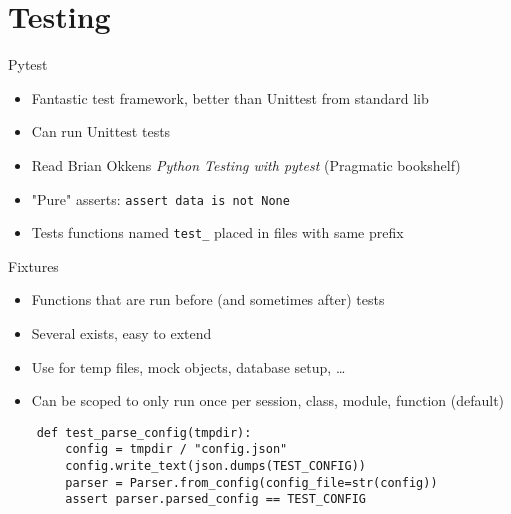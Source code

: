 \section{Testing}

\begin{frame}{Pytest}
  \begin{itemize}
    \item Fantastic test framework, better than Unittest from standard lib
    \item Can run Unittest tests
    \item Read Brian Okkens \emph{Python Testing with pytest} (Pragmatic bookshelf)
    \item "Pure" asserts: \texttt{assert data is not None}
    \item Tests functions named \texttt{test\_} placed in files with same prefix
  \end{itemize}
\end{frame}



\begin{frame}[fragile]{Fixtures}
  \begin{itemize}
    \item Functions that are run before (and sometimes after) tests
    \item Several exists, easy to extend
    \item Use for temp files, mock objects, database setup, …
    \item Can be scoped to only run once per session, class, module, function (default)
  \end{itemize}

  \begin{verbatim}
    def test_parse_config(tmpdir):
        config = tmpdir / "config.json"
        config.write_text(json.dumps(TEST_CONFIG))
        parser = Parser.from_config(config_file=str(config))
        assert parser.parsed_config == TEST_CONFIG
  \end{verbatim}
\end{frame}

